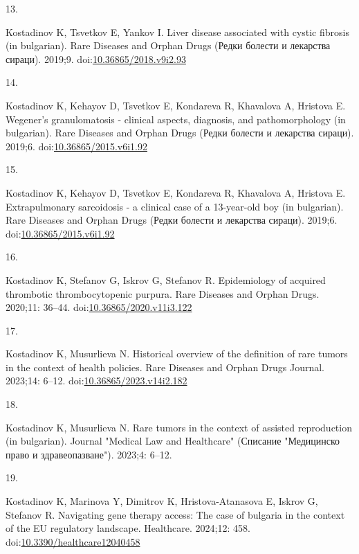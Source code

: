 \documentclass[
  12pt,
  letterpaper,
  DIV=11,
  numbers=noendperiod]{scrartcl}
\newlength{\cslhangindent}
\newlength{\csllabelwidth}
\newenvironment{CSLReferences}[2] %
 {\begin{list}{}{%
  \setlength{\itemindent}{0pt}
  \setlength{\leftmargin}{0pt}
  \setlength{\parsep}{0pt}
  \ifodd #1
   \setlength{\leftmargin}{\cslhangindent}
   \setlength{\itemindent}{-1\cslhangindent}
  \fi
  \setlength{\itemsep}{#2\baselineskip}}}
 {\end{list}}
\newcommand{\CSLLeftMargin}[1]{\parbox[t]{\csllabelwidth}{\strut#1\strut}}
\newcommand{\CSLRightInline}[1]{\parbox[t]{\linewidth - \csllabelwidth}{\strut#1\strut}}
\begin{document}
\begin{CSLReferences}{0}{1}
\CSLLeftMargin{13. }%
\CSLRightInline{Kostadinov K, Tsvetkov E, Yankov I. Liver disease
associated with cystic fibrosis (in bulgarian). Rare Diseases and Orphan
Drugs (Редки болести и лекарства сираци). 2019;9.
doi:\href{https://doi.org/10.36865/2018.v9i2.93}{10.36865/2018.v9i2.93}}

\CSLLeftMargin{14. }%
\CSLRightInline{Kostadinov K, Kehayov D, Tsvetkov E, Kondareva R,
Khavalova A, Hristova E. Wegener's granulomatosis - clinical aspects,
diagnosis, and pathomorphology (in bulgarian). Rare Diseases and Orphan
Drugs (Редки болести и лекарства сираци). 2019;6.
doi:\href{https://doi.org/10.36865/2015.v6i1.92}{10.36865/2015.v6i1.92}}

\CSLLeftMargin{15. }%
\CSLRightInline{Kostadinov K, Kehayov D, Tsvetkov E, Kondareva R,
Khavalova A, Hristova E. Extrapulmonary sarcoidosis - a clinical case of
a 13-year-old boy (in bulgarian). Rare Diseases and Orphan Drugs (Редки
болести и лекарства сираци). 2019;6.
doi:\href{https://doi.org/10.36865/2015.v6i1.92}{10.36865/2015.v6i1.92}}

\CSLLeftMargin{16. }%
\CSLRightInline{Kostadinov K, Stefanov G, Iskrov G, Stefanov R.
Epidemiology of acquired thrombotic thrombocytopenic purpura. Rare
Diseases and Orphan Drugs. 2020;11: 36--44.
doi:\href{https://doi.org/10.36865/2020.v11i3.122}{10.36865/2020.v11i3.122}}

\CSLLeftMargin{17. }%
\CSLRightInline{Kostadinov K, Musurlieva N. Historical overview of the
definition of rare tumors in the context of health policies. Rare
Diseases and Orphan Drugs Journal. 2023;14: 6--12.
doi:\href{https://doi.org/10.36865/2023.v14i2.182}{10.36865/2023.v14i2.182}}

\CSLLeftMargin{18. }%
\CSLRightInline{Kostadinov K, Musurlieva N. Rare tumors in the context
of assisted reproduction (in bulgarian). Journal "Medical Law and
Healthcare" (Списание "Медицинско право и здравеопазване"). 2023;4:
6--12. }

\CSLLeftMargin{19. }%
\CSLRightInline{Kostadinov K, Marinova Y, Dimitrov K, Hristova-Atanasova
E, Iskrov G, Stefanov R. Navigating gene therapy access: The case of
bulgaria in the context of the EU regulatory landscape. Healthcare.
2024;12: 458.
doi:\href{https://doi.org/10.3390/healthcare12040458}{10.3390/healthcare12040458}}


\end{CSLReferences}
\end{document}
